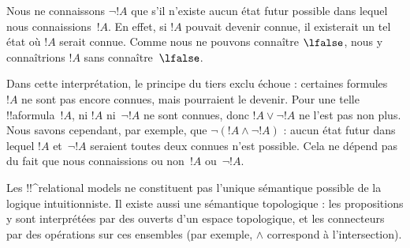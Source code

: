 \documentclass[../../../include/open-logic-section]{subfiles}
\begin{document}
Nous ne connaissons $\lnot !A$ que s'il n'existe aucun état futur
possible dans lequel nous connaissions~$!A$. En effet, si $!A$
pouvait devenir connue, il existerait un tel état où $!A$ serait
connue. Comme nous ne pouvons connaître $\lfalse$, nous y
connaîtrions $!A$ sans connaître~$\lfalse$.

Dans cette interprétation, le principe du tiers exclu échoue :
certaines formules~$!A$ ne sont pas encore connues, mais pourraient
le devenir. Pour une telle !!a{formula}~$!A$, ni $!A$ ni~$\lnot !A$
ne sont connues, donc $!A \lor \lnot !A$ ne l'est pas non plus.
Nous savons cependant, par exemple, que $\lnot(!A
\land \lnot !A)$ : aucun état futur dans lequel $!A$ et~$\lnot !A$
seraient toutes deux connues n'est possible. Cela ne dépend pas du
fait que nous connaissions ou non~$!A$ ou~$\lnot !A$.

Les !!^{relational model}s ne constituent pas l'unique sémantique
possible de la logique intuitionniste. Il existe aussi une sémantique
topologique : les propositions y sont interprétées par des ouverts
d'un espace topologique, et les connecteurs par des opérations sur
ces ensembles (par exemple, $\land$ correspond à l'intersection).
\end{document}
